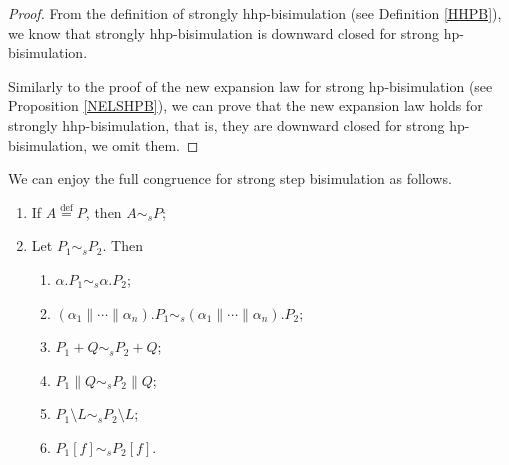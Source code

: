 \begin{proof}
From the definition of strongly hhp-bisimulation (see Definition \ref{HHPB}), we know that strongly hhp-bisimulation is downward closed for strong hp-bisimulation.

Similarly to the proof of the new expansion law for strong hp-bisimulation (see Proposition \ref{NELSHPB}), we can prove that the new expansion law holds for strongly hhp-bisimulation, that is, they are downward closed for strong hp-bisimulation, we omit them.
\end{proof}

\begin{theorem} \label{CSSB}
We can enjoy the full congruence for strong step bisimulation as follows.
\begin{enumerate}
  \item If $A\overset{\text{def}}{=}P$, then $A\sim_s P$;
  \item Let $P_1\sim_s P_2$. Then
        \begin{enumerate}
           \item $\alpha.P_1\sim_s \alpha.P_2$;
           \item $(\alpha_1\parallel\cdots\parallel\alpha_n).P_1\sim_s (\alpha_1\parallel\cdots\parallel\alpha_n).P_2$;
           \item $P_1+Q\sim_s P_2 +Q$;
           \item $P_1\parallel Q\sim_s P_2\parallel Q$;
           \item $P_1\setminus L\sim_s P_2\setminus L$;
           \item $P_1[f]\sim_s P_2[f]$.
         \end{enumerate}
\end{enumerate}
\end{theorem}

